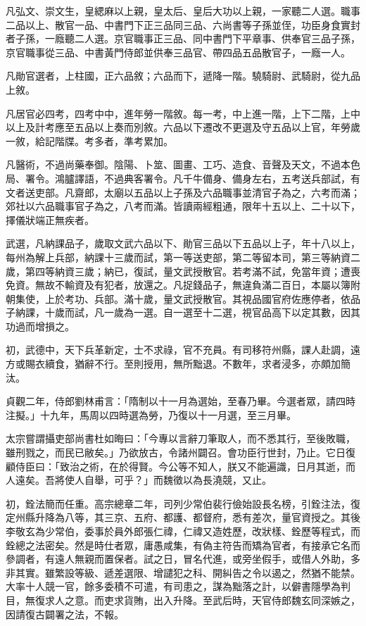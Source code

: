 \begin{pinyinscope}
 凡弘文、崇文生，皇緦麻以上親，皇太后、皇后大功以上親，一家聽二人選。職事二品以上、散官一品、中書門下正三品同三品、六尚書等子孫並侄，功臣身食實封者子孫，一廕聽二人選。京官職事正三品、同中書門下平章事、供奉官三品子孫，京官職事從三品、中書黃門侍郎並供奉三品官、帶四品五品散官子，一廕一人。



 凡勛官選者，上柱國，正六品敘；六品而下，遞降一階。驍騎尉、武騎尉，從九品上敘。



 凡居官必四考，四考中中，進年勞一階敘。每一考，中上進一階，上下二階，上中以上及計考應至五品以上奏而別敘。六品以下遷改不更選及守五品以上官，年勞歲一敘，給記階牒。考多者，準考累加。



 凡醫術，不過尚藥奉御。陰陽、卜筮、圖畫、工巧、造食、音聲及天文，不過本色局、署令。鴻臚譯語，不過典客署令。凡千牛備身、備身左右，五考送兵部試，有文者送吏部。凡齋郎，太廟以五品以上子孫及六品職事並清官子為之，六考而滿；郊社以六品職事官子為之，八考而滿。皆讀兩經粗通，限年十五以上、二十以下，擇儀狀端正無疾者。



 武選，凡納課品子，歲取文武六品以下、勛官三品以下五品以上子，年十八以上，每州為解上兵部，納課十三歲而試，第一等送吏部，第二等留本司，第三等納資二歲，第四等納資三歲；納已，復試，量文武授散官。若考滿不試，免當年資；遭喪免資。無故不輸資及有犯者，放還之。凡捉錢品子，無違負滿二百日，本屬以簿附朝集使，上於考功、兵部。滿十歲，量文武授散官。其視品國官府佐應停者，依品子納課，十歲而試，凡一歲為一選。自一選至十二選，視官品高下以定其數，因其功過而增損之。



 初，武德中，天下兵革新定，士不求祿，官不充員。有司移符州縣，課人赴調，遠方或賜衣續食，猶辭不行。至則授用，無所黜退。不數年，求者浸多，亦頗加簡汰。



 貞觀二年，侍郎劉林甫言：「隋制以十一月為選始，至春乃畢。今選者眾，請四時注擬。」十九年，馬周以四時選為勞，乃復以十一月選，至三月畢。



 太宗嘗謂攝吏部尚書杜如晦曰：「今專以言辭刀筆取人，而不悉其行，至後敗職，雖刑戮之，而民已敝矣。」乃欲放古，令諸州闢召。會功臣行世封，乃止。它日復顧侍臣曰：「致治之術，在於得賢。今公等不知人，朕又不能遍識，日月其逝，而人遠矣。吾將使人自舉，可乎？」而魏徵以為長澆競，又止。



 初，銓法簡而任重。高宗總章二年，司列少常伯裴行儉始設長名榜，引銓注法，復定州縣升降為八等，其三京、五府、都護、都督府，悉有差次，量官資授之。其後李敬玄為少常伯，委事於員外郎張仁禕，仁禕又造姓歷，改狀樣、銓歷等程式，而銓總之法密矣。然是時仕者眾，庸愚咸集，有偽主符告而矯為官者，有接承它名而參調者，有遠人無親而置保者。試之日，冒名代進，或旁坐假手，或借人外助，多非其實。雖繁設等級、遞差選限、增譴犯之科、開糾告之令以遏之，然猶不能禁。大率十人競一官，餘多委積不可遣，有司患之，謀為黜落之計，以僻書隱學為判目，無復求人之意。而吏求貨賄，出入升降。至武后時，天官侍郎魏玄同深嫉之，因請復古闢署之法，不報。




\end{pinyinscope}

